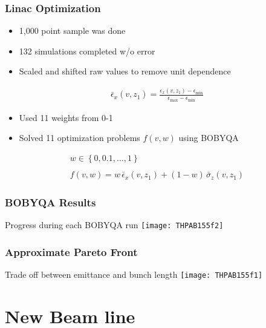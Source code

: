 \documentclass{beamer}
\begin{document}
\begin{frame}
	\frametitle{Linac Optimization}
	 \begin{itemize}
		  	\item{1,000 point sample was done}
		  	\item{132 simulations completed w/o error}
		  	\item{Scaled and shifted raw values to remove unit dependence}
	 \end{itemize}
	 \begin{align*}
	 \bar{\epsilon}_x (v,z_1) = \frac{ \epsilon_x (v,z_1) - \epsilon_{\min} } { \epsilon_{\max} - \epsilon_{\min} }
	 \end{align*}
	 
	 \begin{itemize}
	  	\item{Used 11 weights from 0-1}
	  	\item{Solved 11 optimization problems $f(v,w)$ using BOBYQA}
	 \end{itemize}
	 \begin{gather*}
	 w\in\left\{ 0, 0.1, \ldots, 1 \right\}\\ \\
	 f(v,w) = w \,\bar{\epsilon}_x(v,z_1) + (1-w)\, \bar{\sigma}_z(v,z_1)
	 \end{gather*}
	

\end{frame}

\begin{frame}
	\frametitle{BOBYQA Results}
	Progress during each BOBYQA run
	\texttt{[image: THPAB155f2]}
\end{frame}

\begin{frame}
	\frametitle{Approximate Pareto Front}
	\centering
	Trade off between emittance and bunch length
	\texttt{[image: THPAB155f1]}
\end{frame}

\section{New Beam line}
\end{document}
